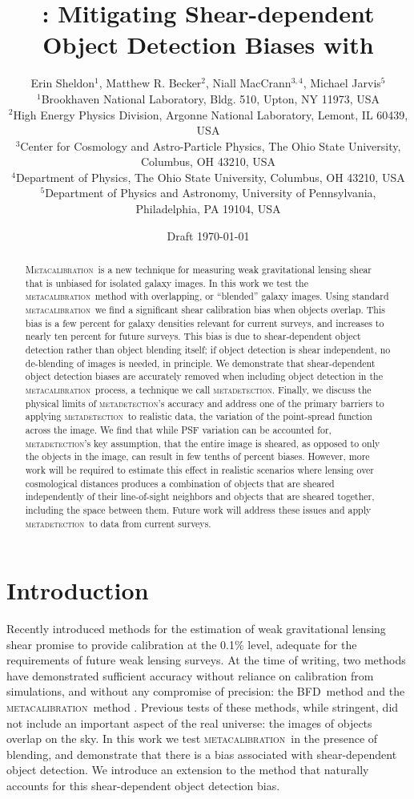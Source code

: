 \documentclass[fleqn,useAMS,usenatbib]{mnras}
\title[\Mdet]{\Mdet: Mitigating Shear-dependent Object Detection Biases with \Mcal}
\author[Sheldon et~al.]{Erin Sheldon$^1$, Matthew R. Becker$^2$,
Niall MacCrann$^{3,4}$, Michael Jarvis$^5$
  \\$^1$Brookhaven National Laboratory, Bldg. 510, Upton, NY 11973, USA
  \\$^2$High Energy Physics Division, Argonne National Laboratory, Lemont, IL 60439, USA
  \\$^3$Center for Cosmology and Astro-Particle Physics, The Ohio State University, Columbus, OH 43210, USA
  \\$^4$Department of Physics, The Ohio State University, Columbus, OH 43210, USA
  \\$^5$Department of Physics and Astronomy, University of Pennsylvania, Philadelphia, PA 19104, USA
}
\newcommand{\mcal}{\textsc{metacalibration}}
\newcommand{\mdet}{\textsc{metadetection}}
\newcommand{\Mcal}{\textsc{Metacalibration}}
\newcommand{\bfd}{\textsc{BFD}}
\begin{document}
\date{Draft \today}
\maketitle

\begin{abstract}

\Mcal\ is a new technique for measuring weak gravitational lensing shear that
is unbiased for isolated galaxy images.  In this work we test the \mcal\ method
with overlapping, or ``blended'' galaxy images.  Using standard \mcal\ we find
a significant shear calibration bias when objects overlap. This bias is a few
percent for galaxy densities relevant for current surveys, and increases to
nearly ten percent for future surveys.  This bias is due to shear-dependent
object detection rather than object blending itself; if object detection is shear
independent, no de-blending of images is needed, in principle.
We demonstrate that shear-dependent object detection biases are accurately
removed when including object detection in the \mcal\ process, a technique we call
\mdet. Finally, we discuss the physical limits of \mdet's accuracy and address one
of the primary barriers to applying \mdet\ to realistic data, the variation of the
point-spread function across the image. We find that while PSF variation can be
accounted for, \mdet's key assumption, that the entire image is sheared, as opposed to
only the objects in the image, can result in few tenths of percent biases. However,
more work will be required to estimate this effect in realistic scenarios
where lensing over cosmological distances produces a combination of objects that
are sheared independently of their line-of-sight neighbors and objects that are
sheared together, including the space between them. Future work will address these
issues and apply \mdet\ to data from current surveys.

\end{abstract}

\section{Introduction}


Recently introduced methods for the estimation of weak gravitational lensing
shear promise to provide calibration at the 0.1\% level, adequate for the
requirements of future weak lensing surveys.  At the time of writing, two
methods have demonstrated sufficient accuracy without reliance on calibration
from simulations, and without any compromise of precision: the \bfd\ method
\citep{BernBFD2016} and the \mcal\ method \citep{HuffMcal2017,SheldonMcal2017}.
Previous tests of these methods, while stringent, did not include an important
aspect of the real universe: the images of objects overlap on the sky. In this
work we test \mcal\ in the presence of blending, and demonstrate that there is
a bias associated with shear-dependent object detection. We introduce an
extension to the method that naturally accounts for this shear-dependent
object detection bias.
\end{document}
